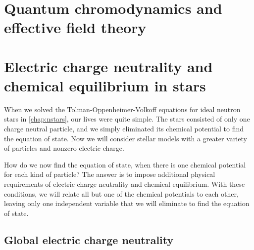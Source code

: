 


\section{Quantum chromodynamics and effective field theory}


\section{Electric charge neutrality and chemical equilibrium in stars}


When we solved the Tolman-Oppenheimer-Volkoff equations for ideal neutron stars in \cref{chap:nstars}, our lives were quite simple.
The stars consisted of only one charge neutral particle, and we simply eliminated its chemical potential to find the equation of state.
Now we will consider stellar models with a greater variety of particles and nonzero electric charge.

How do we now find the equation of state, when there is one chemical potential for each kind of particle?
The answer is to impose additional physical requirements of electric charge neutrality and chemical equilibrium.
With these conditions, we will relate all but one of the chemical potentials to each other, leaving only one independent variable that we will eliminate to find the equation of state.

\subsection{Global electric charge neutrality}


